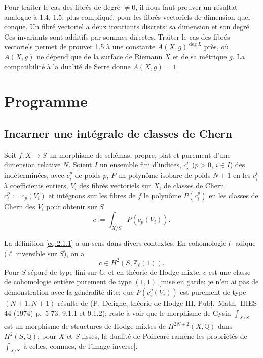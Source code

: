 \documentclass[12pt,a4paper]{article}
\theoremstyle{plain}
\theoremstyle{definition}
\newcommand{\ZZ}{\mathbb{Z}}
\newcommand{\QQ}{\mathbb{Q}}
\newcommand{\CC}{\mathbb{C}}
\begin{document}
Pour traiter le cas des fibr\'es de degr\'e $\neq 0$, il nous faut prouver un r\'esultat
analogue \`a 1.4, 1.5, plus compliqu\'e, pour les fibr\'es vectoriels de dimension quel-
conque. Un fibr\'e vectoriel a deux invariants discrets: sa dimension et son degr\'e.
Ces invariants sont additifs par sommes directes. Traiter le cas des fibr\'es vectoriels
permet de prouver 1.5 \`a une constante $A(X,g)^{\deg L}$ pr\`es, o\`u $A(X,g)$ ne d\'epend
que de la surface de Riemann $X$ et de sa m\'etrique $g$. La compatibilit\'e \`a la
dualit\'e de Serre donne $A(X,g) = 1$.



\section{Programme}

\subsection{Incarner une int\'egrale de classes de Chern}

Soit $f: X \to S$ un morphisme de sch\'emas, propre, plat et purement d'une
dimension relative $N$. Soient $I$ un ensemble fini d'indices, $c_i^p$ ($p > 0$, $i \in I$)
des ind\'etermin\'ees, avec $c_i^p$ de poids $p$, $P$ un polyn\^ome isobare de poids $N+1$
en les $c_i^p$ \`a coefficients entiers, $V_i$ des fibr\'es vectoriels sur $X$, de classes
de Chern $c_i^p := c_p(V_i)$ et int\'egrons sur les fibres de $f$ le polyn\^ome $P(c_i^p)$
en les classes de Chern des $V_i$ pour obtenir sur $S$
\begin{equation}\label{eq:2.1.1}
c := \int_{X/S} P(c_p(V_i)) .
\end{equation}

La d\'efinition \eqref{eq:2.1.1} a un sens dans divers contextes. En cohomologie $l$-
adique ($\ell$ inversible sur $S$), on a
\[
c \in H^2(S, \ZZ_\ell(1)) .
\]
Pour $S$ s\'epar\'e de type fini sur $\CC$, et en th\'eorie de Hodge mixte, $c$ est une
classe de cohomologie enti\`ere purement de type $(1,1)$ [mise en garde: je n'en
ai pas de d\'emonstration avec la g\'en\'eralit\'e dite; que $P(c_i^p(V_i))$ est purement
de type $(N+1, N+1)$ r\'esulte de (P.~Deligne, th\'eorie de Hodge III, Publ.\ Math.\ IHES 44 (1974) p.~5-73, 9.1.1 et 9.1.2); reste \`a voir que le morphisme de
Gysin $\int_{X/S}$ est un morphisme de structures de Hodge mixtes de $H^{2N+2}(X, \QQ)$
dans $H^2(S, \QQ)$; pour $X$ et $S$ lisses, la dualit\'e de Poincar\'e ram\`ene les propri\'et\'es
de $\int_{X/S}$ \`a celles, connues, de l'image inverse].
\end{document}
